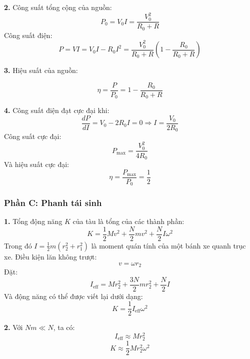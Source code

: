 \noindent\textbf{2.} Công suất tổng cộng của nguồn:
\begin{equation*}
  P_0 = V_0 I = \frac{V_0^2}{R_0 + R}
\end{equation*}
Công suất điện:
\begin{equation*}
  P = VI = V_0 I - R_0 I^2 = \frac{V_0^2}{R_0 + R} \left(1 - \frac{R_0}{R_0 + R} \right)
\end{equation*}

\noindent\textbf{3.} Hiệu suất của nguồn:

\begin{equation*}
  \eta = \frac{P}{P_0} = 1 - \frac{R_0}{R_0 + R}
\end{equation*}

\noindent\textbf{4.} Công suất điện đạt cực đại khi:
\begin{equation*}
  \frac{dP}{dI} = V_0 - 2 R_0 I = 0 \Rightarrow I = \frac{V_0}{2 R_0}
\end{equation*}
Công suất cực đại:
\begin{equation*}
  P_{\text{max}} = \frac{V_0^2}{4 R_0}
\end{equation*}
Và hiệu suất cực đại:
\begin{equation*}
  \eta = \frac{P_{\text{max}}}{P_0} = \frac{1}{2}
\end{equation*}

\subsubsection*{Phần C: Phanh tái sinh}
\noindent\textbf{1.} Tổng động năng $K$ của tàu là tổng của các thành phần:
\begin{equation*}
  K = \frac{1}{2} M v^2 + \frac{N}{2} m v^2 + \frac{N}{2} I \omega^2
\end{equation*}
Trong đó $I = \frac{1}{2} m (r_2^2 + r_1^2)$ là moment quán tính của một bánh xe quanh trục xe. Điều kiện lăn không trượt:
\begin{equation*}
  v = \omega r_2
\end{equation*}
Đặt:
\begin{equation*}
  I_{\text{eff}} = M r_2^2 + \frac{3N}{2} m r_2^2 + \frac{N}{2} I
\end{equation*}
Và động năng có thể được viết lại dưới dạng:
\begin{equation*}
  K = \frac{1}{2} I_{\text{eff}} \omega^2
\end{equation*}

\noindent\textbf{2.} Với $Nm \ll N$, ta có:
\begin{equation*}
  I_{\text{eff}} \approx M r_2^2
\end{equation*}
\begin{equation*}
  K \approx \frac{1}{2} M r_2^2 \omega^2
\end{equation*}

